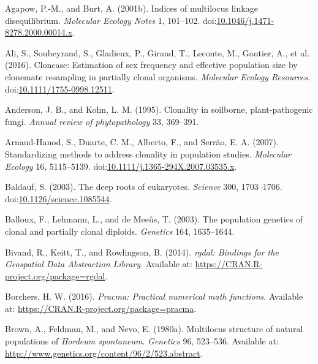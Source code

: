 \documentclass[double,12pt]{beavtex}
\begin{document}
  \hypertarget{ref-Agapow:2001}{}
  Agapow, P.-M., and Burt, A. (2001b). Indices of multilocus linkage
  disequilibrium. \emph{Molecular Ecology Notes} 1, 101--102.
  doi:\href{https://doi.org/10.1046/j.1471-8278.2000.00014.x}{10.1046/j.1471-8278.2000.00014.x}.
  
  \hypertarget{ref-ali2016cloncase}{}
  Ali, S., Soubeyrand, S., Gladieux, P., Giraud, T., Leconte, M., Gautier,
  A., et al. (2016). Cloncase: Estimation of sex frequency and effective
  population size by clonemate resampling in partially clonal organisms.
  \emph{Molecular Ecology Resources}.
  doi:\href{https://doi.org/10.1111/1755-0998.12511}{10.1111/1755-0998.12511}.
  
  \hypertarget{ref-anderson1995clonality}{}
  Anderson, J. B., and Kohn, L. M. (1995). Clonality in soilborne,
  plant-pathogenic fungi. \emph{Annual review of phytopathology} 33,
  369--391.
  
  \hypertarget{ref-arnaud2007standardizing}{}
  Arnaud-Hanod, S., Duarte, C. M., Alberto, F., and Serrão, E. A. (2007).
  Standardizing methods to address clonality in population studies.
  \emph{Molecular Ecology} 16, 5115--5139.
  doi:\href{https://doi.org/10.1111/j.1365-294X.2007.03535.x}{10.1111/j.1365-294X.2007.03535.x}.
  
  \hypertarget{ref-baldauf2003deep}{}
  Baldauf, S. (2003). The deep roots of eukaryotes. \emph{Science} 300,
  1703--1706.
  doi:\href{https://doi.org/10.1126/science.1085544}{10.1126/science.1085544}.
  
  \hypertarget{ref-balloux2003population}{}
  Balloux, F., Lehmann, L., and de Meeûs, T. (2003). The population
  genetics of clonal and partially clonal diploids. \emph{Genetics} 164,
  1635--1644.
  
  \hypertarget{ref-bivand2014rgdal}{}
  Bivand, R., Keitt, T., and Rowlingson, B. (2014). \emph{rgdal: Bindings
  for the Geospatial Data Abstraction Library}. Available at:
  \url{https://CRAN.R-project.org/package=rgdal}.
  
  \hypertarget{ref-borchers2016pracma}{}
  Borchers, H. W. (2016). \emph{Pracma: Practical numerical math
  functions}. Available at:
  \url{https://CRAN.R-project.org/package=pracma}.
  
  \hypertarget{ref-Brown:1980}{}
  Brown, A., Feldman, M., and Nevo, E. (1980a). Multilocus structure of
  natural populations of \emph{Hordeum spontaneum}. \emph{Genetics} 96,
  523--536. Available at:
  \url{http://www.genetics.org/content/96/2/523.abstract}.
  
\end{document}
